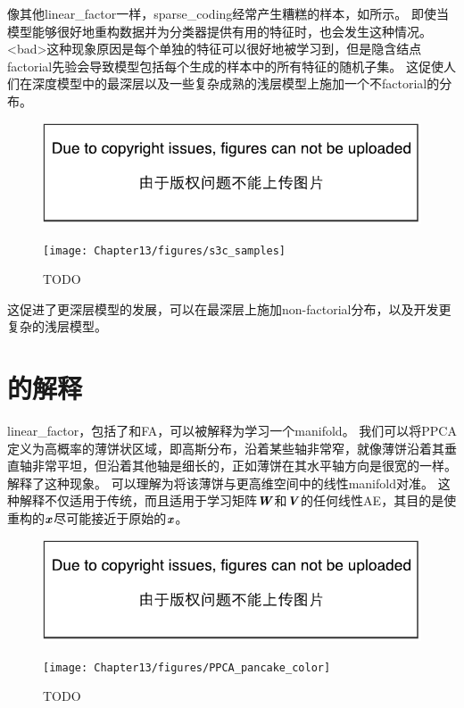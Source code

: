 像其他\gls{linear_factor}一样，\gls{sparse_coding}经常产生糟糕的样本，如所示。
即使当模型能够很好地重构数据并为分类器提供有用的特征时，也会发生这种情况。
<bad>这种现象原因是每个单独的特征可以很好地被学习到，但是隐含结点\gls{factorial}先验会导致模型包括每个生成的样本中的所有特征的随机子集。
这促使人们在深度模型中的最深层以及一些复杂成熟的浅层模型上施加一个不\gls{factorial}的分布。

\begin{figure}[!htb]
\ifOpenSource
\centerline{\includegraphics{figure.pdf}}
\else
	\centerline{\texttt{[image: Chapter13/figures/s3c\_samples]}}
\fi
	\caption{TODO}
	\label{fig:s3c_samples}
\end{figure}

这促进了更深层模型的发展，可以在最深层上施加non-factorial分布，以及开发更复杂的浅层模型。


\section{的解释}
\label{sec:manifold_interpretation_of_pca}


\gls{linear_factor}，包括了和\gls{FA}，可以被解释为学习一个\gls{manifold}\citep{hinton97modelling}。
我们可以将\gls{PPCA}定义为高概率的薄饼状区域，即高斯分布，沿着某些轴非常窄，就像薄饼沿着其垂直轴非常平坦，但沿着其他轴是细长的，正如薄饼在其水平轴方向是很宽的一样。
解释了这种现象。
可以理解为将该薄饼与更高维空间中的线性\gls{manifold}对准。
这种解释不仅适用于传统，而且适用于学习矩阵$\boldsymbol{\mathit{W}}$和$\boldsymbol{\mathit{V}}$的任何线性\gls{AE}，其目的是使重构的$\boldsymbol{\mathit{x}}$尽可能接近于原始的$\boldsymbol{\mathit{x}}$。

\begin{figure}[!htb]
\ifOpenSource
\centerline{\includegraphics{figure.pdf}}
\else
	\centerline{\texttt{[image: Chapter13/figures/PPCA\_pancake\_color]}}
\fi
	\caption{TODO}
    \label{fig:PPCA_pancake}
\end{figure}


